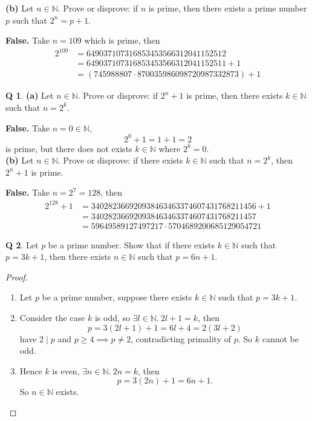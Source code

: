 \documentclass[12pt]{article}
\theoremstyle{definition}
\newtheorem{qn}{Q}
\numberwithin{equation}{qn}
\newcommand{\nat}{\mathbb{N}}
\newenvironment{prf}
{
    \begin{proof}
        \hfill
        \begin{enumerate}[label*=\arabic*.]
                }
                {
                \hfill\qedsymbol
        \end{enumerate}
    \renewcommand{\qedsymbol}{}
    \end{proof}
}
\begin{document}
\textbf{\phantom{Q 9. }(b)}
Let $n\in\nat$. Prove or disprove: if $n$ is prime, then there exists a prime number $p$ such that $2^n = p+1$.

\textbf{False.}
Take $n=109$ which is prime, then
\begin{align*}
    2^{109} &= 649037107316853453566312041152512    \\
    &= 649037107316853453566312041152511 + 1        \\
    &= (745988807 \cdot 870035986098720987332873) + 1
\end{align*}

\begin{qn}
\textbf{(a)}
    Let $n\in\nat$. Prove or disprove: if $2^n + 1$ is prime,
    then there exists $k \in\nat$ such that $n = 2^k$.
\end{qn}

\textbf{False.}
Take $n = 0\in\nat$, $$2^0 + 1 = 1 + 1 = 2$$ is prime,
but there does not exists $k\in\nat$ where $2^k = 0$.\\

\textbf{\phantom{Q 10. }(b)}
Let $n\in\nat$. Prove or disprove: if there exists $k \in\nat$ such that $n = 2^k$,
then $2^n + 1$ is prime.

\textbf{False.}
Take $n = 2^7 = 128$, then
\begin{align*}
    2^{128} + 1 &= 340282366920938463463374607431768211456 + 1   \\
    &= 340282366920938463463374607431768211457   \\
    &= 59649589127497217 \cdot 5704689200685129054721
\end{align*}

\begin{qn}
    Let $p$ be a prime number. Show that if there exists $k\in\nat$ such that $p=3k+1$,
    then there exists $n\in\nat$ such that $p=6n+1$.
\end{qn}
\begin{prf}
\item Let $p$ be a prime number, suppose there exists $k\in\nat$ such that
    $p = 3k + 1$.
\item Consider the case $k$ is odd, so $\exists l\in\nat.~ 2l + 1 = k$, then
    $$p = 3(2l+1) + 1 = 6l + 4 = 2(3l + 2)$$
    have $2\mid p$ and $p\geq 4\implies p \ne 2$, contradicting primality of $p$. So $k$ cannot be odd.
\item Hence $k$ is even, $\exists n\in\nat.~ 2n = k$, then
    $$p = 3(2n) + 1 = 6n + 1.$$
    So $n\in\nat$ exists.
\end{prf}
\end{document}
